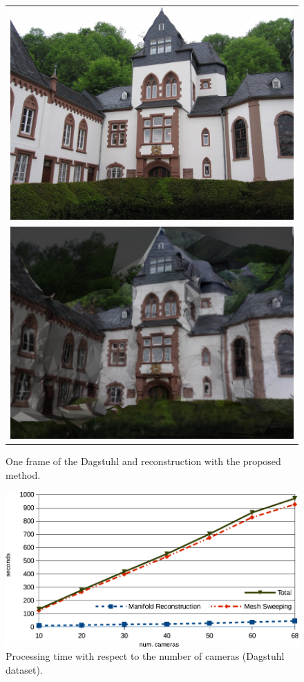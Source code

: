 \begin{figure}[t]
\setlength{\tabcolsep}{1px}
\centering
\begin{tabular}{c}
\includegraphics[width=0.8\columnwidth]{./img/dag004}\\
\includegraphics[width=0.8\columnwidth]{./img/d_crop}\\
\end{tabular}
\caption{One frame of the Dagstuhl and reconstruction with the proposed method.}
\label{fig:Dagstuhl}
\end{figure}

\begin{figure}[t]
\centering
\includegraphics[width=0.99\columnwidth]{./img/timing}
\caption{Processing time with respect to the number of cameras (Dagstuhl dataset).}
\label{fig:scalability}
\end{figure}


